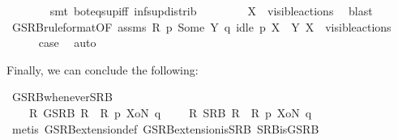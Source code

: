 \begin{isabellebody}
\ \ \ \ \ \ \isamarkupfalse%
\ {\isacharparenleft}{\kern0pt}smt\ bot{\isacharunderscore}{\kern0pt}eq{\isacharunderscore}{\kern0pt}sup{\isacharunderscore}{\kern0pt}iff\ inf{\isacharunderscore}{\kern0pt}sup{\isacharunderscore}{\kern0pt}distrib{}{\isacharparenright}{\kern0pt}\isanewline
\ \ \ \ \isamarkupfalse%
\ {}{\isacharparenleft}{\kern0pt}{}{\isacharparenright}{\kern0pt}\ \isamarkupfalse%
\ {\isacartoucheopen}X\ {\isasymsubseteq}\ visible{\isacharunderscore}{\kern0pt}actions{\isacartoucheclose}\ \isamarkupfalse%
\ blast\isanewline
\ \ \ \ \isamarkupfalse%
\ GSRB{\isacharunderscore}{\kern0pt}ruleformat{\isacharparenleft}{\kern0pt}{}{\isacharparenright}{\kern0pt}{\isacharbrackleft}{\kern0pt}OF\ assms\ {\isacartoucheopen}R\ p\ {\isacharparenleft}{\kern0pt}Some\ Y{\isacharparenright}{\kern0pt}\ q{\isacartoucheclose}\ {\isacartoucheopen}idle\ p\ {\isacharparenleft}{\kern0pt}X\ {\isasymunion}\ Y{\isacharparenright}{\kern0pt}{\isacartoucheclose}\ {\isacartoucheopen}X\ {\isasymsubseteq}\ visible{\isacharunderscore}{\kern0pt}actions{\isacartoucheclose}\ {}{\isacharparenleft}{\kern0pt}{}{\isacharparenright}{\kern0pt}{\isacharbrackright}{\kern0pt}\isanewline
\ \ \ \ \isamarkupfalse%
\ {\isacharquery}{\kern0pt}case\ \isamarkupfalse%
\ auto\isanewline
\ \ \isamarkupfalse%
\isanewline
{}\isamarkupfalse%
%
\endisatagproof
{\isafoldproof}%
%
\isadelimproof
%
\endisadelimproof
%
\begin{isamarkuptext}%
Finally, we can conclude the following:%
\end{isamarkuptext}\isamarkuptrue%
\isamarkupfalse%
\ GSRB{\isacharunderscore}{\kern0pt}whenever{\isacharunderscore}{\kern0pt}SRB{\isacharcolon}{\kern0pt}\isanewline
\ \ \ {\isacartoucheopen}{\isacharparenleft}{\kern0pt}{\isasymexists}\ R{\isachardot}{\kern0pt}\ GSRB\ R\ {\isasymand}\ R\ p\ XoN\ q{\isacharparenright}{\kern0pt}\ \ {\isasymLongleftrightarrow}\ \ {\isacharparenleft}{\kern0pt}{\isasymexists}\ R{\isachardot}{\kern0pt}\ SRB\ R\ {\isasymand}\ R\ p\ XoN\ q{\isacharparenright}{\kern0pt}{\isacartoucheclose}\isanewline
%
\isadelimproof
\ \ %
\endisadelimproof
%
\isatagproof
{}\isamarkupfalse%
\ {\isacharparenleft}{\kern0pt}metis\ GSRB{\isacharunderscore}{\kern0pt}extension{\isacharunderscore}{\kern0pt}def\ GSRB{\isacharunderscore}{\kern0pt}extension{\isacharunderscore}{\kern0pt}is{\isacharunderscore}{\kern0pt}SRB\ SRB{\isacharunderscore}{\kern0pt}is{\isacharunderscore}{\kern0pt}GSRB{\isacharparenright}{\kern0pt}%

\end{isabellebody}
